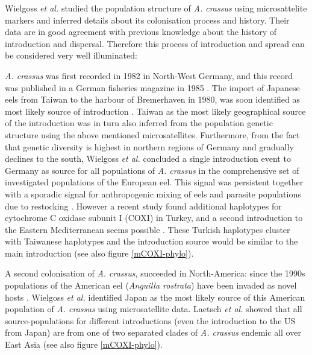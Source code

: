 Wielgoss \textit{et al.} \cite{wielgoss_population_2008} studied the
population structure of \textit{A. crassus} using microsattelite
markers and inferred details about its colonisation process and
history. Their data are in good agreement with previous knowledge
about the history of introduction and dispersal. Therefore this
process of introduction and spread can be considered very well
illuminated:


\textit{A. crassus} was first recorded in 1982 in North-West Germany,
and this record was published in a German fisheries magazine in 1985
\cite{fischer_teichwirt}. The import of Japanese eels from Taiwan to
the harbour of Bremerhaven in 1980, was soon identified as most likely
source of introduction
\cite{koops_anguillicola-infestations_1989}. Taiwan as the most likely
geographical source of the introduction was in turn also inferred from
the population genetic structure using the above mentioned
microsatellites. Furthermore, from the fact that genetic diversity is
highest in northern regions of Germany and gradually declines to the
south, Wielgoss \textit{et al.} \cite{wielgoss_population_2008}
concluded a single introduction event to Germany as source for all
populations of \textit{A. crassus} in the comprehensive set of
investigated populations of the European eel. This signal was
persistent together with a sporadic signal for anthropogenic mixing of
eels and parasite populations due to restocking
\cite{pmid20646147}. However a recent study found additional
haplotypes for cytochrome C oxidase subunit I (COXI) in Turkey, and a
second introduction to the Eastern Mediterranean seems possible
\cite{dl_py}. These Turkish haplotypes cluster with Taiwanese
haplotypes and the introduction source would be similar to the main
introduction (see also figure \ref{mCOXI-phylo}).

A second colonisation of \textit{A. crassus}, succeeded in
North-America: since the 1990s populations of the American eel
(\textit{Anguilla rostrata}) have been invaded as novel hosts
\cite{fries_notes:_1996,barse_exotic_1999,
  barse_swimbladder_2001}. Wielgoss \textit{et al.}
\cite{wielgoss_population_2008} identified Japan as the most likely
source of this American population of \textit{A. crassus} using
microsatellite data. Laetsch \textit{et al.}  \cite{dl_py} showed that
all source-populations for different introductions (even the
introduction to the US from Japan) are from one of two separated
clades of \textit{A. crassus} endemic all over East Asia (see also
figure \ref{mCOXI-phylo}).

